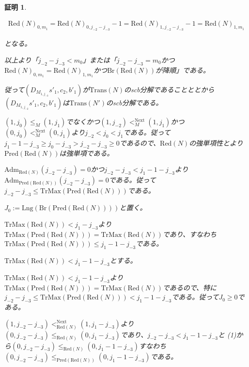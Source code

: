 \documentclass[dvipdfmx,uplatex]{jsarticle}
\theoremstyle{customnonumberbreakfortheorem}
\theoremstyle{customnonumberbreakforproof}
\newtheorem{hideableproof}{証明}
\begin{document}
\begin{hideableproof}
\begin{indented}
\begin{indented}
			\begin{eqnarray*}
			\textrm{Red}(N)_{0,m_1} = \textrm{Red}(N)_{0,j_{-2}-j_{-3}}-1 = \textrm{Red}(N)_{1,j_{-2}-j_{-3}}-1 = \textrm{Red}(N)_{1,m_1}
			\end{eqnarray*}
			\item となる。
		\end{indented}
		\item 以上より「\(j_{-2}-j_{-3} < m_0\)」または「\(j_{-2}-j_{-3} = m_0\)かつ\(\textrm{Red}(N)_{0,m_1} = \textrm{Red}(N)_{1,m_1}\)かつ\(\textrm{Br}(\textrm{Red}(N))\)が降順」である。
		\item 従って\((D_{M_{1,j_{-3}}} s'_1,c_2,b'_1)\)が\(\textrm{Trans}(N)\)のscb分解であることととから\((D_{M_{1,j_{-2}}} s'_1,c_2,b'_1)\)は\(\textrm{Trans}(N')\)のscb分解である。
		\item
		\item \((1,j_0) \leq_M (1,j_1)\)でなくかつ\((1,j_{-2}) <_M^{\textrm{Next}} (1,j_1)\)かつ\((0,j_0) <_M^{\textrm{Next}} (0,j_1)\)より\(j_{-2} < j_0 < j_1\)である。従って\(j_1-1-j_{-3} \geq j_0-j_{-3} > j_{-2}-j_{-3} \geq 0\)であるので、\(\textrm{Red}(N)\)の強単項性とより\(\textrm{Pred}(\textrm{Red}(N))\)は強単項である。
		\item \(\textrm{Adm}_{\textrm{Red}(N)}(j_{-2}-j_{-3}) = 0\)かつ\(j_{-2}-j_{-3} < j_1-1-j_{-3}\)より\(\textrm{Adm}_{\textrm{Pred}(\textrm{Red}(N))}(j_{-2}-j_{-3}) = 0\)である。従って\(j_{-2}-j_{-3} \leq \textrm{TrMax}(\textrm{Pred}(\textrm{Red}(N)))\)である。
		\item \(J_0 := \textrm{Lng}(\textrm{Br}(\textrm{Pred}(\textrm{Red}(N))))\)と置く。
		\item \(\textrm{TrMax}(\textrm{Red}(N)) < j_1-j_{-3}\)より\(\textrm{TrMax}(\textrm{Pred}(\textrm{Red}(N))) = \textrm{TrMax}(\textrm{Red}(N))\)であり、すなわち\(\textrm{TrMax}(\textrm{Pred}(\textrm{Red}(N))) \leq j_1-1-j_{-3}\)である。
		\item \(\textrm{TrMax}(\textrm{Red}(N)) < j_1-1-j_{-3}\)とする。
		\begin{indented}
			\item \(\textrm{TrMax}(\textrm{Red}(N)) < j_1-1-j_{-3}\)より\(\textrm{TrMax}(\textrm{Pred}(\textrm{Red}(N))) = \textrm{TrMax}(\textrm{Red}(N))\)であるので、特に\(j_{-2}-j_{-3} \leq \textrm{TrMax}(\textrm{Pred}(\textrm{Red}(N))) < j_1-1-j_{-3}\)である。従って\(J_0 \geq 0\)である。
			\item \((1,j_{-2}-j_{-3}) <_{\textrm{Red}(N)}^{\textrm{Next}} (1,j_1-j_{-3})\)より\((0,j_{-2}-j_{-3}) \leq_{\textrm{Red}(N)} (0,j_1-j_{-3})\)であり、\(j_{-2}-j_{-3} < j_1-1-j_{-3}\)と (1)から\((0,j_{-2}-j_{-3}) \leq_{\textrm{Red}(N)} (0,j_1-1-j_{-3})\)すなわち\((0,j_{-2}-j_{-3}) \leq_{\textrm{Pred}(\textrm{Red}(N))} (0,j_1-1-j_{-3})\)である。

\end{indented}
\end{indented}
\end{hideableproof}
\end{document}
